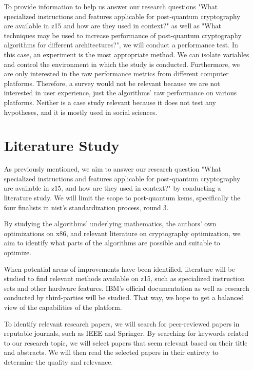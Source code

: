 To provide information to help us answer our research questions "What specialized instructions and features applicable for \gls{post-quantum} cryptography are available in \gls{z15} and how are they used in context?" as well as "What techniques may be used to increase performance of \gls{post-quantum} cryptography algorithms for different architectures?", we will conduct a performance test. In this case, an experiment is the most appropriate method. We can isolate variables and control the environment in which the study is conducted. Furthermore, we are only interested in the raw performance metrics from different computer platforms. Therefore, a survey would not be relevant because we are not interested in user experience, just the algorithms' raw performance on various platforms. Neither is a case study relevant because it does not test any hypotheses, and it is mostly used in social sciences\cite{wohlin2012}.

\section{Literature Study}
\label{section:method:literature-study}

As previously mentioned, we aim to answer our research question "What specialized instructions and features applicable for post-quantum cryptography are available in \gls{z15}, and how are they used in context?" by conducting a literature study. We will limit the scope to post-quantum \glspl{kem}, specifically the four finalists in \gls{nist}'s standardization process, round 3.

By studying the algorithms' underlying mathematics, the authors' own optimizations on \gls{x86}, and relevant literature on cryptography optimization, we aim to identify what parts of the algorithms are possible and suitable to optimize.

When potential areas of improvements have been identified, literature will be studied to find relevant methods available on \gls{z15}, such as specialized instruction sets and other hardware features. IBM's official documentation as well as research conducted by third-parties will be studied. That way, we hope to get a balanced view of the capabilities of the platform.

To identify relevant research papers, we will search for peer-reviewed papers in reputable journals, such as IEEE and Springer. By searching for keywords related to our research topic, we will select papers that seem relevant based on their title and abstracts. We will then read the selected papers in their entirety to determine the quality and relevance.

